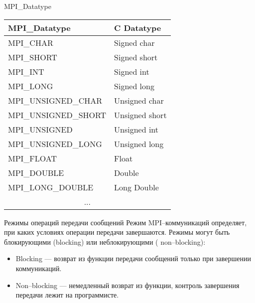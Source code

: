 \begin{frame}{MPI_Datatype}
\begin{table}[htpb]
    \begin{center}
    \begin{tabular}{|l|l|}
    \hline
    MPI_Datatype        &   C Datatype      \\
    \hline
    MPI_CHAR            &   Signed char     \\
    MPI_SHORT           &   Signed short    \\
    MPI_INT             &   Signed int      \\
    MPI_LONG            &   Signed long     \\
    MPI_UNSIGNED_CHAR   &   Unsigned char   \\
    MPI_UNSIGNED_SHORT  &   Unsigned short  \\
    MPI_UNSIGNED        &   Unsigned int    \\
    MPI_UNSIGNED_LONG   &   Unsigned long   \\
    MPI_FLOAT           &   Float           \\
    MPI_DOUBLE          &   Double          \\
    MPI_LONG_DOUBLE     &   Long Double     \\
    \multicolumn{2}{|c|}{...}               \\
    \hline
    \end{tabular}
    \end{center}
\end{table}
\end{frame}

\begin{frame}{Режимы операций передачи сообщений}
Режим MPI--коммуникаций определяет, при каких условиях операции передачи
завершаются.
\vfill
Режимы могут быть блокирующими (\abbr blocking) или неблокирующими (\abbr
non--blocking):
\begin{itemize}
    \item Blocking --- возврат из функции передачи сообщений только при
    завершении коммуникаций.
    \item Non--blocking --- немедленный возврат из функции, контроль завершения
    передачи лежит на программисте.
\end{itemize}
\end{frame}

